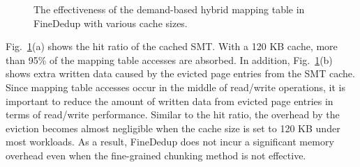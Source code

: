 \begin{figure}[t]
	\center
	\caption{The effectiveness of the demand-based hybrid mapping table in FineDedup with various cache sizes.}
	\label{fig:mappingoverhead}
\end{figure}

Fig.~\ref{fig:mappingoverhead}(a) shows the hit ratio of the cached SMT. 
With a 120 KB cache, more than 95\% of the mapping table accesses are absorbed.
In addition, Fig.~\ref{fig:mappingoverhead}(b) shows extra written data caused by the evicted page entries 
from the SMT cache.
Since mapping table accesses occur in the middle of read/write operations, it is important to reduce the 
amount of written data from evicted page entries in terms of read/write performance.
Similar to the hit ratio, the overhead by the eviction becomes almost negligible 
when the cache size is set to 120 KB under most workloads.
As a result, FineDedup does not incur a significant memory overhead 
even when the fine-grained chunking method is not effective.



